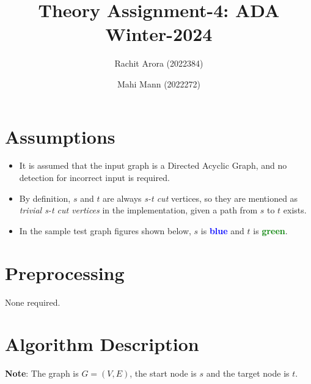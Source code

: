 \documentclass{article}
\title{Theory Assignment-4: ADA Winter-2024}
\author{Rachit Arora (2022384) \and Mahi Mann (2022272)}
\date{}
\begin{document}

\maketitle

\section{Assumptions}

\begin{itemize}
    \item It is assumed that the input graph is a Directed Acyclic Graph, and no detection for incorrect input is required.

    \item By definition, $s$ and $t$ are always \emph{s-t cut} vertices, so they are mentioned as \emph{trivial s-t cut vertices} in the implementation, given a path from $s$ to $t$ exists. 

    \item In the sample test graph figures shown below, $s$ is \textbf{\textcolor{blue}{blue}} and $t$ is \textbf{\textcolor{green}{green}}.

\end{itemize}

\section{Preprocessing}

None required.

\section{Algorithm Description}

\textbf{Note}: The graph is $G = (V,E)$, the start node is $s$ and the target node is $t$.
\end{document}
